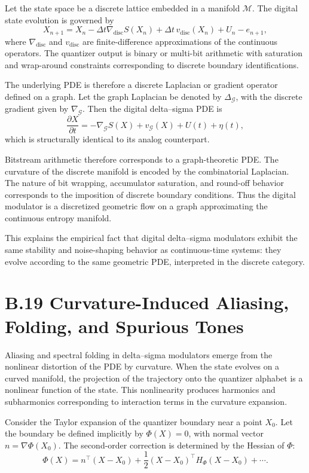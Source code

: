 Let the state space be a discrete lattice embedded in a manifold \(\mathcal{M}\). The digital state evolution is governed by
\[
X_{n+1} = X_{n}
- \Delta t \nabla_{\mathrm{disc}} S(X_{n})
+ \Delta t\, v_{\mathrm{disc}}(X_{n})
+ U_{n}
- e_{n+1},
\]
where \(\nabla_{\mathrm{disc}}\) and \(v_{\mathrm{disc}}\) are finite-difference approximations of the continuous operators. The quantizer output is binary or multi-bit arithmetic with saturation and wrap-around constraints corresponding to discrete boundary identifications.

The underlying PDE is therefore a discrete Laplacian or gradient operator defined on a graph. Let the graph Laplacian be denoted by \(\Delta_{\mathcal{G}}\), with the discrete gradient given by \(\nabla_{\mathcal{G}}\). Then the digital delta–sigma PDE is
\[
\frac{\partial X}{\partial t}
= -\nabla_{\mathcal{G}} S(X)
+ v_{\mathcal{G}}(X)
+ U(t)
+ \eta(t),
\]
which is structurally identical to its analog counterpart.

Bitstream arithmetic therefore corresponds to a graph-theoretic PDE. The curvature of the discrete manifold is encoded by the combinatorial Laplacian. The nature of bit wrapping, accumulator saturation, and round-off behavior corresponds to the imposition of discrete boundary conditions. Thus the digital modulator is a discretized geometric flow on a graph approximating the continuous entropy manifold.

This explains the empirical fact that digital delta–sigma modulators exhibit the same stability and noise-shaping behavior as continuous-time systems: they evolve according to the same geometric PDE, interpreted in the discrete category.

\section{B.19 Curvature-Induced Aliasing, Folding, and Spurious Tones}

Aliasing and spectral folding in delta–sigma modulators emerge from the nonlinear distortion of the PDE by curvature. When the state evolves on a curved manifold, the projection of the trajectory onto the quantizer alphabet is a nonlinear function of the state. This nonlinearity produces harmonics and subharmonics corresponding to interaction terms in the curvature expansion.

Consider the Taylor expansion of the quantizer boundary near a point \(X_{0}\). Let the boundary be defined implicitly by \(\Phi(X) = 0\), with normal vector \(n = \nabla \Phi(X_{0})\). The second-order correction is determined by the Hessian of \(\Phi\):
\[
\Phi(X) = n^{\top}(X-X_{0})
+ \frac{1}{2}(X-X_{0})^{\top} H_{\Phi} (X-X_{0})
+ \cdots.
\]

